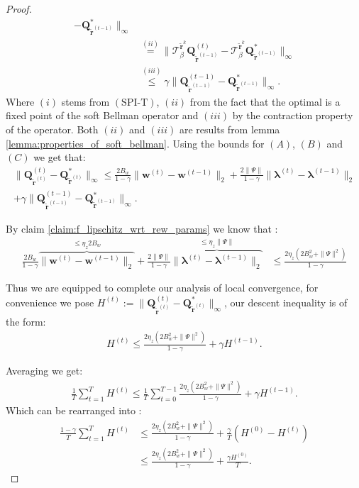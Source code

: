 \begin{proof}
\begin{align*}
    - \bm{Q}^*_{\tilde{\bm{r}}^{(t-1)}} 
    \|_\infty  \\
    & \stackrel{(ii)}{=} 
    \|  
    \mathcal{T}^{\tilde{\bm{r}}^{k}}_\beta 
    \bm{Q}^{(t)}_{\tilde{\bm{r}}^{(t-1)}}  
    - \mathcal{T}^{\tilde{\bm{r}}^{k}}_\beta
    \bm{Q}^*_{\tilde{\bm{r}}^{(t-1)}} 
    \|_\infty  \\
    & \stackrel{(iii)}{\leq} 
    \gamma
    \|  
    \bm{Q}^{(t-1)}_{\tilde{\bm{r}}^{(t-1)}}  
    -  \bm{Q}^*_{\tilde{\bm{r}}^{(t-1)}} 
    \|_\infty.
\end{align*}
Where $(i)$ stems from $(\text{SPI-T})$, $(ii)$ from the fact that the optimal is a fixed point of the soft Bellman operator and $(iii)$ by the contraction property of the operator. Both $(ii)$ and $(iii)$ are results from lemma \ref{lemma:properties_of_soft_bellman}.
Using the bounds for $(A)$, $(B)$ and $(C)$ we get that: 
\begin{align*}
    \|\bm{Q}^{(t)}_{\tilde{\bm{r}}^{(t)}}- \bm{Q}^*_{\tilde{\bm{r}}^{(t)}} \|_\infty 
    \leq
    \frac{2B_w}{1 - \gamma} \| \bm{w}^{(t)} - \bm{w}^{(t-1)} \|_2 +
    \frac{2\|\Psi\|}{1 - \gamma} \| \bm{\lambda}^{(t)} - \bm{\lambda}^{(t-1)} \|_2 
    \\+ \gamma
    \|  
    \bm{Q}^{(t-1)}_{\tilde{\bm{r}}^{(t-1)}}  
    -  \bm{Q}^*_{\tilde{\bm{r}}^{(t-1)}} 
    \|_\infty.
\end{align*}

By claim \ref{claim:f_lipschitz_wrt_rew_params} we know that :
\begin{align*}
    \frac{2B_w}{1 - \gamma} 
    \overbrace{\| \bm{w}^{(t)} - \bm{w}^{(t-1)} \|_2}^{
        \leq\eta_z 2B_w
    }
    +
    \frac{2\|\Psi\|}{1 - \gamma}
    \overbrace{\| \bm{\lambda}^{(t)} - \bm{\lambda}^{(t-1)} \|_2}^{
        \leq \eta_z\|\Psi\|
    }
    &\leq 
    \frac{2\eta_z(2 B_w^2+\|\Psi\|^2)}{1 - \gamma} 
\end{align*}

Thus we are equipped to complete our analysis of local convergence, for convenience we pose $H^{(t)} := \|\bm{Q}^{(t)}_{\tilde{\bm{r}}^{(t)}}- \bm{Q}^*_{\tilde{\bm{r}}^{(t)}} \|_\infty$, our descent inequality is of the form:
\begin{align*}
    H^{(t)} \leq \frac{2\eta_z(2 B_w^2+\|\Psi\|^2)}{1 - \gamma}   + \gamma H^{(t-1)}.
\end{align*}

Averaging we get:
\begin{align*}
   \frac{1}{T} \sum^{T}_{t=1} H^{(t)} \leq
   \frac{1}{T} \sum^{T-1}_{t=0}\frac{2\eta_z(2 B_w^2+\|\Psi\|^2)}{1 - \gamma} + \gamma H^{(t-1)}.
\end{align*}
Which can be rearranged into :
\begin{align*}
   \frac{1-\gamma}{T} \sum^{T}_{t=1} H^{(t)} 
   &\leq
   \frac{2\eta_z(2 B_w^2+\|\Psi\|^2)}{1 - \gamma}  +
   \frac{\gamma}{T} (H^{(0)}-H^{(t)})\\
   &\leq
   \frac{2\eta_z(2 B_w^2+\|\Psi\|^2)}{1 - \gamma}  +
   \frac{\gamma H^{(0)}}{T}.
\end{align*}


\end{proof}
